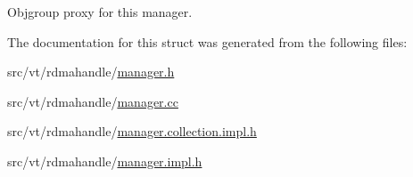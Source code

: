 Objgroup proxy for this manager. 



The documentation for this struct was generated from the following files\+:\begin{DoxyCompactItemize}
\item 
src/vt/rdmahandle/\hyperlink{rdmahandle_2manager_8h}{manager.\+h}\item 
src/vt/rdmahandle/\hyperlink{rdmahandle_2manager_8cc}{manager.\+cc}\item 
src/vt/rdmahandle/\hyperlink{manager_8collection_8impl_8h}{manager.\+collection.\+impl.\+h}\item 
src/vt/rdmahandle/\hyperlink{rdmahandle_2manager_8impl_8h}{manager.\+impl.\+h}\end{DoxyCompactItemize}
